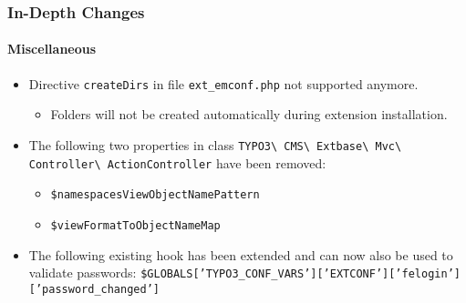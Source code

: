 \begin{frame}[fragile]
	\frametitle{In-Depth Changes}
	\framesubtitle{Miscellaneous}

	\begin{itemize}
		\item Directive \texttt{createDirs} in file \texttt{ext\_emconf.php} not supported anymore.

			\begin{itemize}\smaller
				\item[\ding{228}] Folders will not be created automatically during extension installation.
			\end{itemize}\normalsize

		\item The following two properties in class
			\texttt{TYPO3\textbackslash
				CMS\textbackslash
				Extbase\textbackslash
				Mvc\textbackslash
				Controller\textbackslash
				ActionController}\newline
			have been removed:

			\begin{itemize}
				\item \texttt{\$namespacesViewObjectNamePattern}
				\item \texttt{\$viewFormatToObjectNameMap}
			\end{itemize}

		\item The following existing hook has been extended and can now
			also be used to validate passwords:\newline
			{\fontsize{8}{10} \selectfont \texttt{\$GLOBALS['TYPO3\_CONF\_VARS']['EXTCONF']['felogin']['password\_changed']}}

	\end{itemize}

\end{frame}



